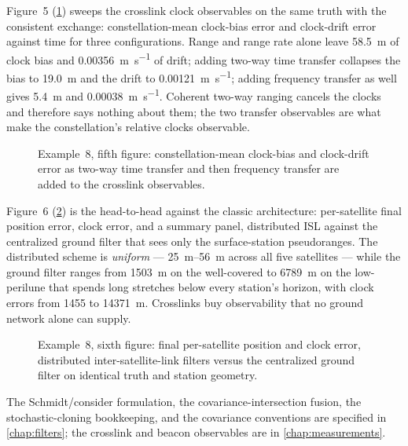 Figure~5 (\cref{fig:tut-ex8-transfer}) sweeps the crosslink clock observables
on the same truth with the consistent exchange: constellation-mean clock-bias
error and clock-drift error against time for three configurations. Range and
range rate alone leave \SI{58.5}{\meter} of clock bias and
\SI{0.00356}{\meter\per\second} of drift; adding two-way time transfer collapses
the bias to \SI{19.0}{\meter} and the drift to
\SI{0.00121}{\meter\per\second}; adding frequency transfer as well gives
\SI{5.4}{\meter} and \SI{0.00038}{\meter\per\second}. Coherent two-way ranging
cancels the clocks and therefore says nothing about them; the two transfer
observables are what make the constellation's relative clocks observable.

\begin{figure}[htbp]
  \centering
  \caption{Example~8, fifth figure: constellation-mean clock-bias and
           clock-drift error as two-way time transfer and then frequency
           transfer are added to the crosslink observables.}
  \label{fig:tut-ex8-transfer}
\end{figure}

Figure~6 (\cref{fig:tut-ex8-central}) is the head-to-head against the classic
architecture: per-satellite final position error, clock error, and a summary
panel, distributed ISL against the centralized ground filter that sees only the
surface-station pseudoranges. The distributed scheme is \emph{uniform} ---
\SIrange{25}{56}{\meter} across all five satellites --- while the ground filter
ranges from \SI{1503}{\meter} on the well-covered  to
\SI{6789}{\meter} on the low-perilune  that spends long stretches
below every station's horizon, with clock errors from \SI{1455}{} to
\SI{14371}{\meter}. Crosslinks buy observability that no ground network alone
can supply.

\begin{figure}[htbp]
  \centering
  \caption{Example~8, sixth figure: final per-satellite position and clock error,
           distributed inter-satellite-link filters versus the centralized
           ground filter on identical truth and station geometry.}
  \label{fig:tut-ex8-central}
\end{figure}

The Schmidt/consider formulation, the covariance-intersection fusion, the
stochastic-cloning bookkeeping, and the covariance conventions are specified in
\cref{chap:filters}; the crosslink and beacon observables are in
\cref{chap:measurements}.

